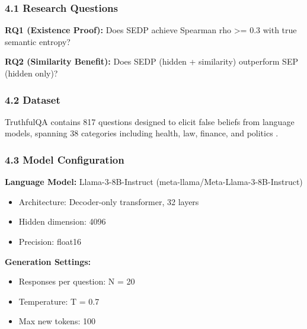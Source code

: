 
\subsubsection{4.1 Research Questions}

\textbf{RQ1 (Existence Proof):} Does SEDP achieve Spearman rho >= 0.3 with true semantic entropy?

\textbf{RQ2 (Similarity Benefit):} Does SEDP (hidden + similarity) outperform SEP (hidden only)?

\subsubsection{4.2 Dataset}

TruthfulQA contains 817 questions designed to elicit false beliefs from language models, spanning 38 categories including health, law, finance, and politics \citep{Lin2022TruthfulQA}.

\begin{table}[htbp]
\centering
{}
\end{table}

\subsubsection{4.3 Model Configuration}

\textbf{Language Model:} Llama-3-8B-Instruct (meta-llama/Meta-Llama-3-8B-Instruct)
\begin{itemize}
\item Architecture: Decoder-only transformer, 32 layers
\item Hidden dimension: 4096
\item Precision: float16
\end{itemize}

\textbf{Generation Settings:}
\begin{itemize}
\item Responses per question: N = 20
\item Temperature: T = 0.7
\item Max new tokens: 100
\end{itemize}

